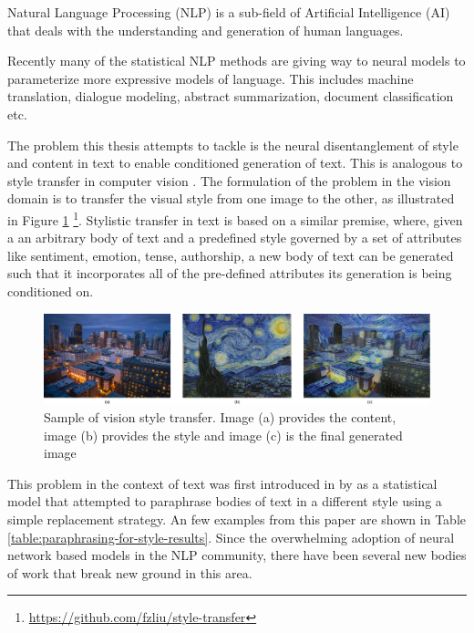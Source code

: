 Natural Language Processing (NLP) is a sub-field of Artificial Intelligence (AI) that deals with the understanding and generation of human languages.

Recently many of the statistical NLP methods are giving way to neural models to parameterize more expressive models of language. This includes machine translation, dialogue modeling, abstract summarization, document classification etc.

The problem this thesis attempts to tackle is the neural disentanglement of style and content in text to enable conditioned generation of text. This is analogous to style transfer in computer vision \citep{gatys2016image}. The formulation of the problem in the vision domain is to transfer the visual style from one image to the other, as illustrated in Figure \ref{fig:style-transfer-vision} \footnote{\url{https://github.com/fzliu/style-transfer}}. Stylistic transfer in text is based on a similar premise, where, given a an arbitrary body of text and a predefined style governed by a set of attributes like sentiment, emotion, tense, authorship, a new body of text can be generated such that it incorporates all of the pre-defined attributes its generation is being conditioned on.

\begin{figure}[ht]
	\centering
	\includegraphics[width=.8\textwidth]{images/style-transfer-vision.png}
	\caption{\label{fig:style-transfer-vision}Sample of vision style transfer. Image (a) provides the content, image (b) provides the style and image (c) is the final generated image}
\end{figure}

This problem in the context of text was first introduced in by \cite{xu2012paraphrasing} as a statistical model that attempted to paraphrase bodies of text in a different style using a simple replacement strategy. An few examples from this paper are shown in Table \ref{table:paraphrasing-for-style-results}. Since the overwhelming adoption of neural network based models in the NLP community, there have been several new bodies of work that break new ground in this area.

